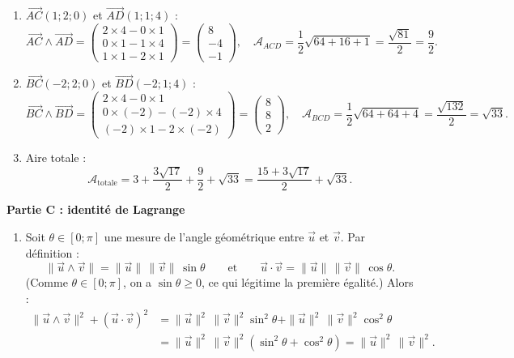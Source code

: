 \documentclass[11pt]{article}
\begin{document}
\begin{corrige}
\begin{enumerate}[resume]
\item $\overrightarrow{AC}(1 ; 2 ; 0)$ et $\overrightarrow{AD}(1 ; 1 ; 4)$ :
\[ \overrightarrow{AC} \wedge \overrightarrow{AD} = \begin{pmatrix} 2\times 4 - 0\times 1 \\ 0\times 1 - 1\times 4 \\ 1\times 1 - 2\times 1 \end{pmatrix} = \begin{pmatrix} 8 \\ -4 \\ -1 \end{pmatrix}, \quad \mathcal{A}_{ACD} = \dfrac{1}{2}\sqrt{64 + 16 + 1} = \dfrac{\sqrt{81}}{2} = \dfrac{9}{2}. \]
\item $\overrightarrow{BC}(-2 ; 2 ; 0)$ et $\overrightarrow{BD}(-2 ; 1 ; 4)$ :
\[ \overrightarrow{BC} \wedge \overrightarrow{BD} = \begin{pmatrix} 2\times 4 - 0\times 1 \\ 0\times(-2) - (-2)\times 4 \\ (-2)\times 1 - 2\times(-2) \end{pmatrix} = \begin{pmatrix} 8 \\ 8 \\ 2 \end{pmatrix}, \quad \mathcal{A}_{BCD} = \dfrac{1}{2}\sqrt{64 + 64 + 4} = \dfrac{\sqrt{132}}{2} = \sqrt{33}. \]
\item Aire totale :
\[ \mathcal{A}_{\text{totale}} = 3 + \dfrac{3\sqrt{17}}{2} + \dfrac{9}{2} + \sqrt{33} = \dfrac{15 + 3\sqrt{17}}{2} + \sqrt{33}. \]
\end{enumerate}
\textbf{Partie C : identité de Lagrange}
\begin{enumerate}[resume]
\item Soit $\theta \in [0 ; \pi]$ une mesure de l'angle géométrique entre $\vec{u}$ et $\vec{v}$. Par définition :
\[ \|\vec{u} \wedge \vec{v}\| = \|\vec{u}\|\,\|\vec{v}\|\,\sin\theta \qquad \text{et} \qquad \vec{u} \cdot \vec{v} = \|\vec{u}\|\,\|\vec{v}\|\,\cos\theta. \]
(Comme $\theta \in [0;\pi]$, on a $\sin\theta \geq 0$, ce qui légitime la première égalité.) Alors :
\begin{align*}
\|\vec{u} \wedge \vec{v}\|^2 + (\vec{u} \cdot \vec{v})^2 &= \|\vec{u}\|^2\,\|\vec{v}\|^2\sin^2\theta + \|\vec{u}\|^2\,\|\vec{v}\|^2\cos^2\theta \\
&= \|\vec{u}\|^2\,\|\vec{v}\|^2\left(\sin^2\theta + \cos^2\theta\right) = \|\vec{u}\|^2\,\|\vec{v}\|^2.
\end{align*}

\end{enumerate}
\end{corrige}
\end{document}
